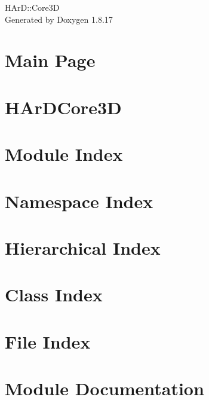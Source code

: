 \let\mypdfximage\pdfximage\def\pdfximage{\immediate\mypdfximage}\documentclass[twoside]{book}
\newcommand{\+}{\discretionary{\mbox{\scriptsize$\hookleftarrow$}}{}{}}
\newcommand{\clearemptydoublepage}{%
  \newpage{\pagestyle{empty}\cleardoublepage}%
}
\begin{document}
\hypersetup{pageanchor=false,
             bookmarksnumbered=true,
             pdfencoding=unicode
            }
\begin{titlepage}
\vspace*{7cm}
\begin{center}%
{\Large H\+ArD\+::Core3D }\\
\vspace*{1cm}
{\large Generated by Doxygen 1.8.17}\\
\end{center}
\end{titlepage}
\clearemptydoublepage
{}
\tableofcontents
\clearemptydoublepage
{}
\hypersetup{pageanchor=true}

\chapter{Main Page}
\label{index}\hypertarget{index}{}
\chapter{H\+Ar\+D\+Core3D}
\label{md_README}

\chapter{Module Index}

\chapter{Namespace Index}

\chapter{Hierarchical Index}

\chapter{Class Index}

\chapter{File Index}

\chapter{Module Documentation}


















\end{document}
